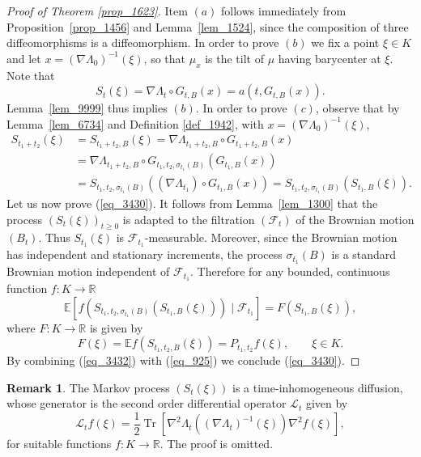 \documentclass[12pt,a4paper]{article}
\newcommand{\Tr}{\mathop{\mathrm{Tr}}\nolimits}
\newcommand{\E}{\mathbb{E}}
\newcommand{\RR}{\mathbb{R}}
\newcommand{\R}{\mathbb{R}}
\theoremstyle{definition}
\newtheorem{remark}[theorem]{Remark}
\begin{document}
\begin{proof}[Proof of Theorem \ref{prop_1623}]
Item $(a)$ follows immediately from Proposition~\ref{prop_1456}
and Lemma~\ref{lem_1524}, since the composition of three diffeomorphisms is a diffeomorphism.
In order to prove $(b)$ we fix a point $\xi \in K$ and
let $x = (\nabla \Lambda_0)^{-1} (\xi)$, so that $\mu_{x}$ is the tilt of $\mu$
having barycenter at $\xi$. Note that
\[
S_t ( \xi )  = \nabla \Lambda_t \circ G_{t,B} ( x )
= a (t , G_{t,B} ( x ) ) .
\]
Lemma~\ref{lem_9999} thus implies $(b)$. In order to prove $(c)$, observe that by Lemma~\ref{lem_6734}
and Definition \ref{def_1942}, with $x = (\nabla \Lambda_0)^{-1} (\xi)$,
\begin{align}\label{eq_3432}
S_{t_1+t_2} (\xi) & = S_{t_1+t_2,B} (\xi)
= \nabla \Lambda_{t_1 + t_2, B} \circ G_{t_1 + t_2, B}(x)
\\ & = \nabla \Lambda_{t_1 + t_2, B} \circ G_{t_1, t_2, \sigma_{t_1}(B) } ( G_{t_1,B} (x) ) \nonumber 
\\ & = S_{t_1, t_2, \sigma_{t_1}(B) }( (\nabla \Lambda_{t_1}) \circ G_{t_1,B} (x) ) = S_{t_1, t_2, \sigma_{t_1}(B) }( S_{t_1,B}(\xi) ).
\nonumber
\end{align}
Let us now prove (\ref{eq_3430}). It follows from Lemma~\ref{lem_1300} that the process $(S_t (\xi))_{t \geq 0}$ is adapted to the filtration $(\mathcal F_{t})$
of the Brownian motion $(B_t)$.
Thus $S_{t_1}(\xi)$ is $\mathcal F_{t_1}$-measurable. Moreover,
since the Brownian motion has independent and stationary increments,
the process $\sigma_{t_1}(B)$ is
a standard Brownian motion independent of $\mathcal F_{t_1}$. Therefore
for any bounded, continuous function $f: K \rightarrow \RR$
\begin{equation}
\E [f ( S_{t_1,t_2 , \sigma_{t_1} ( B ) } ( S_{t_1,B} (\xi) ) ) \mid \mathcal F_{t_1} ] = F ( S_{t_1, B} (\xi) )  ,
\label{eq_925} \end{equation}
where $F: K \rightarrow \RR$ is given by
\[
F( \xi ) = \E f ( S_{t_1,t_2,B} (\xi )) = P_{t_1,t_2} f ( \xi ), \qquad  \xi \in K.
\]
By combining (\ref{eq_3432}) with (\ref{eq_925}) we conclude  (\ref{eq_3430}).
\end{proof}


\begin{remark} The Markov process $(S_{t}(\xi))$ is  a time-inhomogeneous
diffusion, whose generator is the second order
differential operator $\mathcal L_t$ given by
\[
\mathcal L_t f (\xi)  = \frac 12 \Tr \left[
\nabla^2 \Lambda_t \left( (\nabla \Lambda_t)^{-1} (\xi) \right)  \nabla^2 f ( \xi )
\right] ,
\]
for suitable functions $f \colon K \to \R$.
The proof is omitted.
\end{remark}
\end{document}
